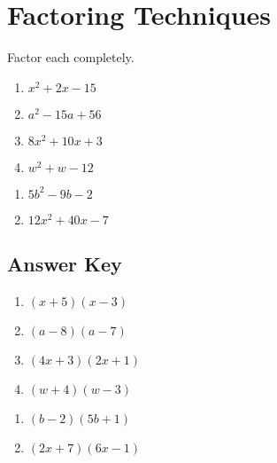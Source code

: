 \chapter{Factoring Techniques}

Factor each completely.

\begin{multicols}{4}
\begin{enumerate}
	\item $x^2 + 2x - 15$
	\item $a^2-15a+56$
	\item $8x^2+10x+3$
	\item $w^2+w-12$
\end{enumerate}	\setcounter{Review}{\value{enumi}}
\end{multicols}
\begin{multicols}{4}
\begin{enumerate}	\setcounter{enumi}{\value{Review}}
	\item $5b^2-9b-2$
	\item $12x^2+40x-7$
\end{enumerate}	\setcounter{Review}{\value{enumi}}
\end{multicols}

\newpage

\section*{Answer Key}

\begin{multicols}{4}
\begin{enumerate}
	\item $(x+5)(x-3)$
    \item $(a-8)(a-7)$
    \item $(4x+3)(2x+1)$
    \item $(w+4)(w-3)$
\end{enumerate}	\setcounter{Review}{\value{enumi}}
\end{multicols}
\begin{multicols}{4}
\begin{enumerate}	\setcounter{enumi}{\value{Review}}
	\item $(b-2)(5b+1)$
    \item $(2x+7)(6x-1)$
\end{enumerate}	\setcounter{Review}{\value{enumi}}
\end{multicols}